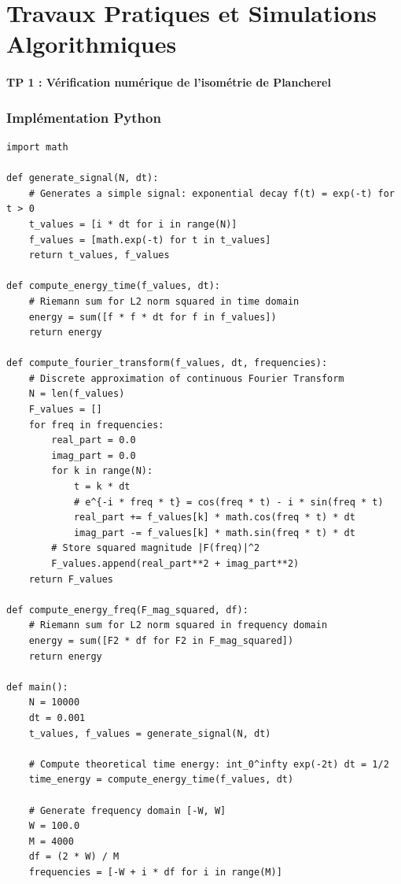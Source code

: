 \documentclass[11pt,a4paper]{article}
\begin{document}
\newpage
\part{Travaux Pratiques et Simulations Algorithmiques}
\subsection*{TP 1 : Vérification numérique de l'isométrie de Plancherel}

\section{Implémentation Python}

\begin{lstlisting}
import math

def generate_signal(N, dt):
    # Generates a simple signal: exponential decay f(t) = exp(-t) for t > 0
    t_values = [i * dt for i in range(N)]
    f_values = [math.exp(-t) for t in t_values]
    return t_values, f_values

def compute_energy_time(f_values, dt):
    # Riemann sum for L2 norm squared in time domain
    energy = sum([f * f * dt for f in f_values])
    return energy

def compute_fourier_transform(f_values, dt, frequencies):
    # Discrete approximation of continuous Fourier Transform
    N = len(f_values)
    F_values = []
    for freq in frequencies:
        real_part = 0.0
        imag_part = 0.0
        for k in range(N):
            t = k * dt
            # e^{-i * freq * t} = cos(freq * t) - i * sin(freq * t)
            real_part += f_values[k] * math.cos(freq * t) * dt
            imag_part -= f_values[k] * math.sin(freq * t) * dt
        # Store squared magnitude |F(freq)|^2
        F_values.append(real_part**2 + imag_part**2)
    return F_values

def compute_energy_freq(F_mag_squared, df):
    # Riemann sum for L2 norm squared in frequency domain
    energy = sum([F2 * df for F2 in F_mag_squared])
    return energy

def main():
    N = 10000
    dt = 0.001
    t_values, f_values = generate_signal(N, dt)

    # Compute theoretical time energy: int_0^infty exp(-2t) dt = 1/2
    time_energy = compute_energy_time(f_values, dt)

    # Generate frequency domain [-W, W]
    W = 100.0
    M = 4000
    df = (2 * W) / M
    frequencies = [-W + i * df for i in range(M)]


\end{lstlisting}
\end{document}
